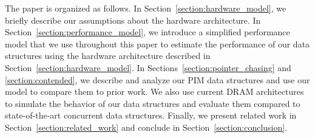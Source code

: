 The paper is organized as follows. In Section~\ref{section:hardware_model}, we 
briefly describe 
our assumptions about the hardware architecture. 
In Section~\ref{section:performance_model}, we introduce a simplified performance 
model 
that we use throughout this paper to estimate the performance of our data structures using 
the hardware 
architecture described in Section~\ref{section:hardware_model}. 
In Sections~\ref{section:pointer_chasing} and \ref{section:contended}, 
we describe and analyze our PIM data structures and use our model to compare 
them to prior work. 
We also use current DRAM architectures to simulate the behavior of our 
data structures and 
evaluate them compared to state-of-the-art concurrent data structures. 
Finally, we present related work in Section~\ref{section:related_work} 
and conclude in Section~\ref{section:conclusion}. 

